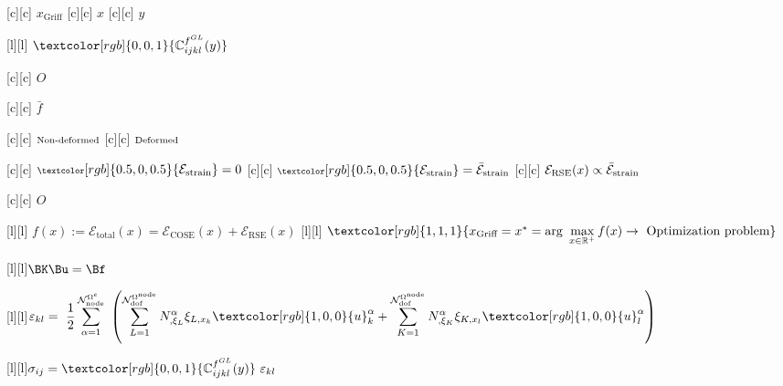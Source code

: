 [c][c] {$x_{\text{Griff}}$}
[c][c] {$x$}
[c][c] {$y$}

[l][l] {$\textcolor[rgb]{0,0,1}{\mathbb{C}_{ijkl}^{f^{GL}}(y)}$}

[c][c] {$O$}

[c][c] {$\bar{f}$}

[c][c] {$\scriptsize \text{Non-deformed}$}
[c][c] {$\scriptsize \text{Deformed}$}

[c][c] {$\scriptsize \textcolor[rgb]{0.5,0,0.5}{\mathcal{E}_{\text{strain}}} = 0$}
[c][c] {$\scriptsize \textcolor[rgb]{0.5,0,0.5}{\mathcal{E}_{\text{strain}}} = \bar{\mathcal{E}}_{\text{strain}}$}
[c][c] {$\scriptsize \mathcal{E}_{\text{RSE}}(x) \propto \bar{\mathcal{E}}_{\text{strain}}$}

[c][c] {$O$}

[l][l] {$f(x):= \mathcal{E}_{\text{total}}(x) = \mathcal{E}_{\text{COSE}}(x) + \mathcal{E}_{\text{RSE}}(x)$}
[l][l] {$\textcolor[rgb]{1,1,1}{x_{\text{Griff}} = x^* = \arg \displaystyle\ \max_{x\in \mathbb{R}^{+}} f(x) \rightarrow \ \text{Optimization problem}}$}

[l][l]{$\displaystyle \BK\Bu = \Bf
	$}

[l][l]{$\displaystyle
	\varepsilon_{kl} = \
	\frac{1}{2} \sum_{\alpha=1}^{\mathcal{N}_{\text{node}}^{\Omega^{e}}} \
	\left( \sum_{L=1}^{\mathcal{N}_{\text{dof}}^{\Omega^{\text{node}}}} N^{\alpha}_{,\xi_{L}}\xi_{L,x_{k}} \textcolor[rgb]{1,0,0}{u}_{k}^{\alpha}
	+\sum_{K=1}^{\mathcal{N}_{\text{dof}}^{\Omega^{\text{node}}}} N^{\alpha}_{,\xi_{K}}\xi_{K,x_{l}} \textcolor[rgb]{1,0,0}{u}_{l}^{\alpha} \right)$}

\psfrag{fest}[l][l]{$\displaystyle \sigma_{ij} = \textcolor[rgb]{0,0,1}{\mathbb{C}_{ijkl}^{f^{GL}}(y)}\ \varepsilon_{kl} $}

